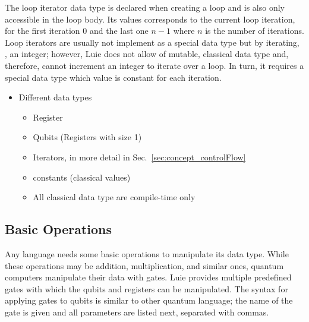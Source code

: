 The loop iterator data type is declared when creating a loop and is also only accessible in the loop body. Its values corresponds to the current loop iteration, \eg for the first iteration $0$ and the last one $n - 1$ where $n$ is the number of iterations. Loop iterators are usually not implement as a special data type but by iterating, \eg, an integer; however, Luie does not allow of mutable, classical data type and, therefore, cannot increment an integer to iterate over a loop. In turn, it requires a special data type which value is constant for each iteration. 
\begin{itemize}
    \item Different data types
    \begin{itemize}
        \item Register
        \item Qubits (Registers with size 1)
        \item Iterators, in more detail in Sec.~\ref{sec:concept_controlFlow}
        \item constants (classical values)
        \item All classical data type are compile-time only
    \end{itemize}
\end{itemize}


\subsection{Basic Operations}
\label{sec:concept_basicOperations}
Any language needs some basic operations to manipulate its data type. While these operations may be addition, multiplication, and similar ones, quantum computers manipulate their data with gates. Luie provides multiple predefined gates with which the qubits and registers can be manipulated. The syntax for applying gates to qubits is similar to other quantum language; the name of the gate is given and all parameters are listed next, separated with commas. 


